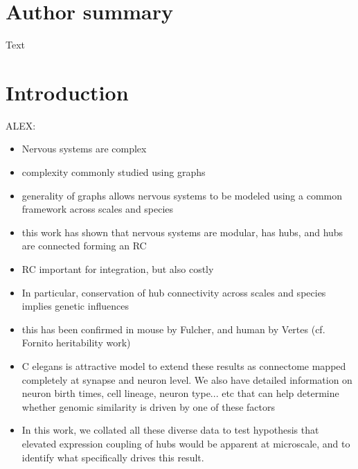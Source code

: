 \documentclass[10pt,letterpaper]{article}
\begin{document}
\section*{Author summary}
Text

\linenumbers

\section*{Introduction}

ALEX:

\begin{itemize}
    \item Nervous systems are complex
    \item complexity commonly studied using graphs
    \item generality of graphs allows nervous systems to be modeled using a common framework across scales and species
    \item this work has shown that nervous systems are modular, has hubs, and hubs are connected forming an RC
    \item RC important for integration, but also costly
    \item In particular, conservation of hub connectivity across scales and species implies genetic influences
    \item this has been confirmed in mouse by Fulcher, and human by Vertes (cf. Fornito heritability work)
    \item C elegans is attractive model to extend these results as connectome mapped completely at synapse and neuron level. We also have detailed information on neuron birth times, cell lineage, neuron type... etc that can help determine whether genomic similarity is driven by one of these factors
    \item In this work, we collated all these diverse data to test hypothesis that elevated expression coupling of hubs would be apparent at microscale, and to identify what specifically drives this result.
\end{itemize}
\end{document}
